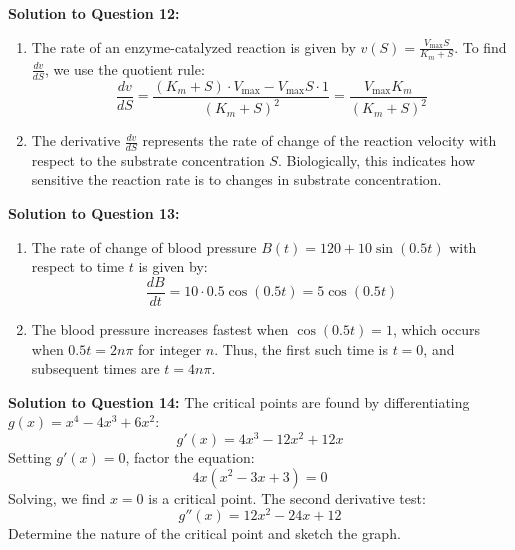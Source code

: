 \documentclass{article}
\begin{document}
    \item \textbf{Solution to Question 12:}
    \begin{enumerate}[label=(\alph*), itemsep=10pt]
        \item The rate of an enzyme-catalyzed reaction is given by \( v(S) = \frac{V_{\max} S}{K_m + S} \). To find \( \frac{dv}{dS} \), we use the quotient rule:
        \[
        \frac{dv}{dS} = \frac{(K_m + S) \cdot V_{\max} - V_{\max} S \cdot 1}{(K_m + S)^2} = \frac{V_{\max} K_m}{(K_m + S)^2}
        \]
        
        \item The derivative \( \frac{dv}{dS} \) represents the rate of change of the reaction velocity with respect to the substrate concentration \( S \). Biologically, this indicates how sensitive the reaction rate is to changes in substrate concentration.
    \end{enumerate}
    \item \textbf{Solution to Question 13:}
    \begin{enumerate}[label=(\alph*), itemsep=10pt]
        \item The rate of change of blood pressure \( B(t) = 120 + 10 \sin(0.5t) \) with respect to time \( t \) is given by:
        \[
        \frac{dB}{dt} = 10 \cdot 0.5 \cos(0.5t) = 5 \cos(0.5t)
        \]
        
        \item The blood pressure increases fastest when \( \cos(0.5t) = 1 \), which occurs when \( 0.5t = 2n\pi \) for integer \( n \). Thus, the first such time is \( t = 0 \), and subsequent times are \( t = 4n\pi \).
    \end{enumerate}

    

    \item \textbf{Solution to Question 14:}
    The critical points are found by differentiating \( g(x) = x^4 - 4x^3 + 6x^2 \):
    \[
    g'(x) = 4x^3 - 12x^2 + 12x
    \]
    Setting \( g'(x) = 0 \), factor the equation:
    \[
    4x(x^2 - 3x + 3) = 0
    \]
    Solving, we find \( x = 0 \) is a critical point. The second derivative test:
    \[
    g''(x) = 12x^2 - 24x + 12
    \]
    Determine the nature of the critical point and sketch the graph.
\end{document}
